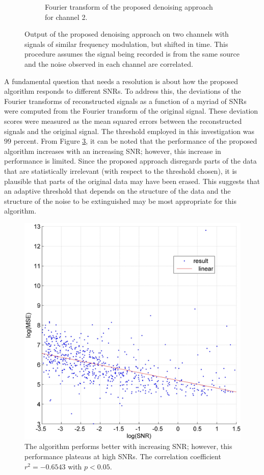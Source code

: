 \documentclass[onecolumn, groupedaddress, 10pt]{revtex4-1}
\begin{document}
\begin{figure}[H]
\begin{subfigure}{.5\textwidth}
  		\caption{\label{fig:denoise_2} Fourier transform of the proposed denoising approach for channel 2.}
	\end{subfigure}
	\caption{Output of the proposed denoising approach on two channels with signals of similar frequency modulation, but shifted in time. This procedure assumes the signal being recorded is from the same source and the noise observed in each channel are correlated.}
\end{figure}

A fundamental question that needs a resolution is about how the proposed algorithm responds to different SNRs. To address this, the deviations of the Fourier transforms of reconstructed signals as a function of a myriad of SNRs were computed from the Fourier transform of the original signal. These deviation scores were measured as the mean squared errors between the reconstructed signals and the original signal. The threshold employed in this investigation was $99$ percent. From Figure \ref{fig:denoise_3}, it can be noted that the performance of the proposed algorithm increases with an increasing SNR; however, this increase in performance is limited. Since the proposed approach disregards parts of the data that are statistically irrelevant (with respect to the threshold chosen), it is plausible that parts of the original data may have been erased. This suggests that an adaptive threshold that depends on the structure of the data and the structure of the noise to be extinguished may be most appropriate for this algorithm.

\begin{figure}[H]
	\centering
  		\includegraphics[scale=0.05]{denoise_3.jpg}
  		\caption{\label{fig:denoise_3} The algorithm performs better with increasing SNR; however, this performance plateaus at high SNRs. The correlation coefficient $r^2 = -0.6543$ with $p < 0.05$.}
\end{figure}
\end{document}
